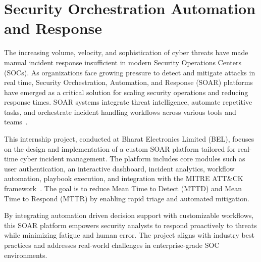 \chapter{Security Orchestration Automation and Response}

The increasing volume, velocity, and sophistication of cyber threats have made manual incident response insufficient in modern Security Operations Centers (SOCs). As organizations face growing pressure to detect and mitigate attacks in real time, Security Orchestration, Automation, and Response (SOAR) platforms have emerged as a critical solution for scaling security operations and reducing response times. SOAR systems integrate threat intelligence, automate repetitive tasks, and orchestrate incident handling workflows across various tools and teams~\cite{paloalto_soar, ibm_soc}.

This internship project, conducted at Bharat Electronics Limited (BEL), focuses on the design and implementation of a custom SOAR platform tailored for real-time cyber incident management. The platform includes core modules such as user authentication, an interactive dashboard, incident analytics, workflow automation, playbook execution, and integration with the MITRE ATT\&CK framework~\cite{mitre_attack}. The goal is to reduce Mean Time to Detect (MTTD) and Mean Time to Respond (MTTR) by enabling rapid triage and automated mitigation.

By integrating automation driven decision support with customizable workflows, this SOAR platform empowers security analysts to respond proactively to threats while minimizing fatigue and human error. The project aligns with industry best practices and addresses real-world challenges in enterprise-grade SOC environments.
